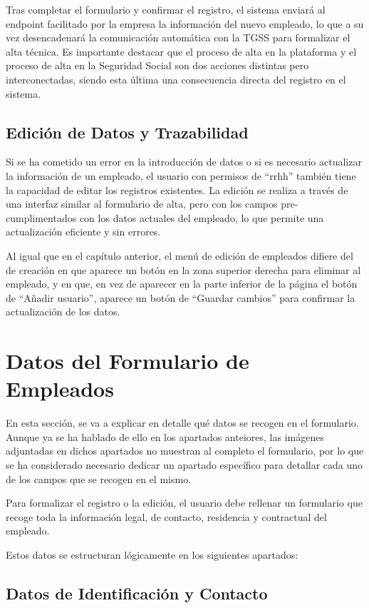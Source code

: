 Tras completar el formulario y confirmar el registro, el sistema enviará al endpoint facilitado por la empresa la información del nuevo empleado, lo que a su vez desencadenará la comunicación automática con la TGSS para formalizar el alta técnica. Es importante destacar que el proceso de alta en la plataforma y el proceso de alta en la Seguridad Social son dos acciones distintas pero interconectadas, siendo esta última una consecuencia directa del registro en el sistema.

\subsection{Edición de Datos y Trazabilidad}

Si se ha cometido un error en la introducción de datos o si es necesario actualizar la información de un empleado, el usuario con permisos de ``rrhh'' también tiene la capacidad de editar los registros existentes. La edición se realiza a través de una interfaz similar al formulario de alta, pero con los campos pre-cumplimentados con los datos actuales del empleado, lo que permite una actualización eficiente y sin errores.

Al igual que en el capítulo anterior, el menú de edición de empleados difiere del de creación en que aparece un botón en la zona superior derecha para eliminar al empleado, y en que, en vez de aparecer en la parte inferior de la página el botón de ``Añadir usuario'', aparece un botón de ``Guardar cambios'' para confirmar la actualización de los datos.
        

\section{Datos del Formulario de Empleados}
En esta sección, se va a explicar en detalle qué datos se recogen en el formulario. Aunque ya se ha hablado de ello en los apartados anteiores, las imágenes adjuntadas en dichos apartados no muestran al completo el formulario, por lo que se ha considerado necesario dedicar un apartado específico para detallar cada uno de los campos que se recogen en el mismo.

Para formalizar el registro o la edición, el usuario debe rellenar un formulario que recoge toda la información legal, de contacto, residencia y contractual del empleado.

Estos datos se estructuran lógicamente en los siguientes apartados:

\subsection{Datos de Identificación y Contacto}


